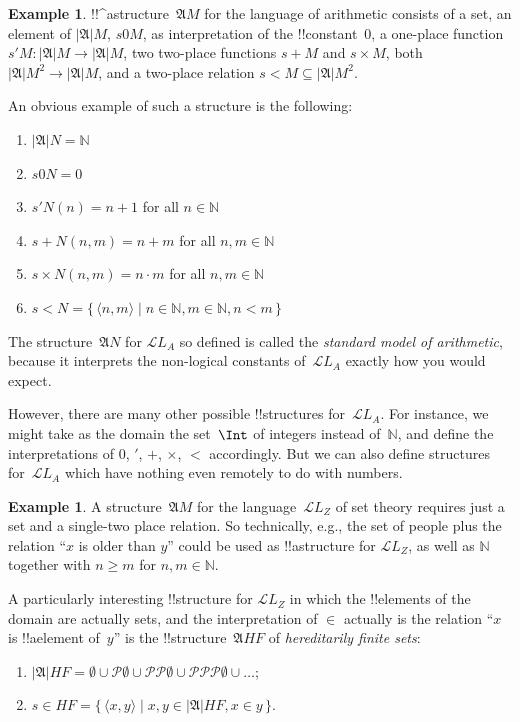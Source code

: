 \documentclass[10pt,a4paper]{article}
\theoremstyle{plain}
\theoremstyle{definition}
\newtheorem{ex}[thm]{Example}
\theoremstyle{remark}
\providecommand{\Obj}{}
\providecommand{\Struct}{\ensuremath{\mathfrak{A}}}
\providecommand{\Domain}{\ensuremath{|\mathfrak{A}|}}
\providecommand{\Assign}{\ensuremath{s}}
\providecommand{\Lang}{\ensuremath{\mathcal{L}}}
\providecommand{\tuple}[1]{\langle #1 \rangle}
\providecommand{\Nat}{\ensuremath{\mathbb{N}}}
\providecommand{\Pow}{\mathcal{P}}
\providecommand{\Setabs}[2]{\{\, #1 \mid #2 \,\}}
\begin{document}
\begin{ex}
!!^a{structure}~$\Struct M$ for the language of arithmetic consists of a
  set, an element of $\Domain M$, $\Assign{\Obj 0}{M}$, as
  interpretation of the !!{constant}~$\Obj 0$, a one-place function
  $\Assign{\Obj \prime}{M} \colon \Domain{M} \to \Domain M$, two
  two-place functions $\Assign{\Obj +}{M}$ and $\Assign{\Obj
    \times}{M}$, both $\Domain M^2 \to \Domain M$, and a two-place
  relation $\Assign{\Obj <}{M} \subseteq \Domain{M}^2$.

An obvious example of such a structure is the following:
\begin{enumerate}
\item $\Domain N = \Nat$
\item $\Assign{\Obj 0}{N} = 0$
\item $\Assign{\Obj \prime}{N}(n) = n + 1$ for all $n \in \Nat$
\item $\Assign{\Obj +}{N}(n, m) = n + m$ for all $n, m \in \Nat$
\item $\Assign{\Obj \times}{N}(n, m) = n\cdot m$ for all $n, m \in \Nat$
\item $\Assign{\Obj <}{N} = \Setabs{\tuple{n, m}}{n \in \Nat, m \in
  \Nat, n < m}$
\end{enumerate}
The structure~$\Struct N$ for $\Lang L_A$ so defined is called the
\emph{standard model of arithmetic}, because it interprets the
non-logical constants of~$\Lang L_A$ exactly how you would expect.

However, there are many other possible !!{structure}s for~$\Lang
L_A$. For instance, we might take as the domain the set~$\Int$ of
integers instead of~$\Nat$, and define the interpretations of $\Obj
0$, $\Obj \prime$, $\Obj +$, $\Obj \times$, $\Obj <$ accordingly.  But
we can also define structures for~$\Lang L_A$ which have nothing even
remotely to do with numbers.
\end{ex}

\begin{ex}
A structure~$\Struct M$ for the language~$\Lang L_Z$ of set theory requires
just a set and a single-two place relation. So technically, e.g., the
set of people plus the relation ``$x$ is older than $y$'' could be
used as !!a{structure} for $\Lang L_Z$, as well as $\Nat$ together
with $n \ge m$ for $n, m \in \Nat$.

A particularly interesting !!{structure} for $\Lang L_Z$ in which the
!!{element}s of the domain are actually sets, and the interpretation
of $\Obj \in$ actually is the relation ``$x$ is !!a{element} of~$y$''
is the !!{structure}~$\Struct{{HF}}$ of \emph{hereditarily finite sets}:
\begin{enumerate}
\item $\Domain{{{HF}}} = \emptyset \cup \Pow{\emptyset} \cup
  \Pow{\Pow{\emptyset}} \cup \Pow{\Pow{\Pow{\emptyset}}} \cup \dots$;
\item $\Assign{\Obj \in}{{{HF}}} = \Setabs{\tuple{x, y}}{x, y \in
  \Domain{{{HF}}}, x \in y}$.
\end{enumerate}
\end{ex}
\end{document}
